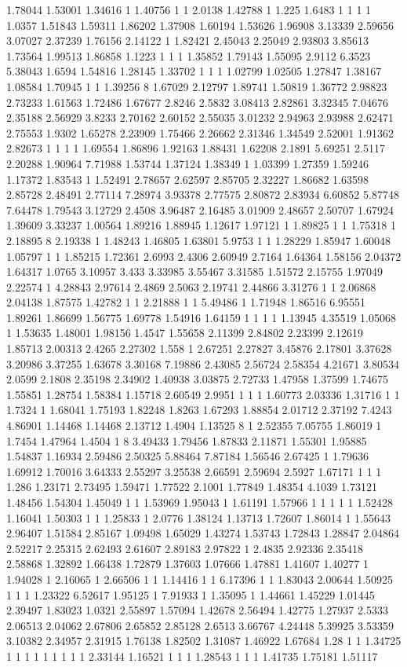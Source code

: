 1.78044 1.53001 1.34616 1 1.40756 1 1 2.0138 1.42788 1 1.225 1.6483 1 1 1 1 1.0357 1.51843 1.59311 1.86202 1.37908 1.60194 1.53626 1.96908 3.13339 2.59656 3.07027 2.37239 1.76156 2.14122 1 1.82421 2.45043 2.25049 2.93803 3.85613 1.73564 1.99513 1.86858 1.1223 1 1 1 1.35852 1.79143 1.55095 2.9112 6.3523 5.38043 1.6594 1.54816 1.28145 1.33702 1 1 1 1.02799 1.02505 1.27847 1.38167 1.08584 1.70945 1 1 1.39256 8 1.67029 2.12797 1.89741 1.50819 1.36772 2.98823 2.73233 1.61563 1.72486 1.67677 2.8246 2.5832 3.08413 2.82861 3.32345 7.04676 2.35188 2.56929 3.8233 2.70162 2.60152 2.55035 3.01232 2.94963 2.93988 2.62471 2.75553 1.9302 1.65278 2.23909 1.75466 2.26662 2.31346 1.34549 2.52001 1.91362 2.82673 1 1 1 1 1.69554 1.86896 1.92163 1.88431 1.62208 2.1891 5.69251 2.5117 2.20288 1.90964 7.71988 1.53744 1.37124 1.38349 1 1.03399 1.27359 1.59246 1.17372 1.83543 1 1.52491 2.78657 2.62597 2.85705 2.32227 1.86682 1.63598 2.85728 2.48491 2.77114 7.28974 3.93378 2.77575 2.80872 2.83934 6.60852 5.87748 7.64478 1.79543 3.12729 2.4508 3.96487 2.16485 3.01909 2.48657 2.50707 1.67924 1.39609 3.33237 1.00564 1.89216 1.88945 1.12617 1.97121 1 1.89825 1 1 1.75318 1 2.18895 8 2.19338 1 1.48243 1.46805 1.63801 5.9753 1 1 1.28229 1.85947 1.60048 1.05797 1 1 1.85215 1.72361 2.6993 2.4306 2.60949 2.7164 1.64364 1.58156 2.04372 1.64317 1.0765 3.10957 3.433 3.33985 3.55467 3.31585 1.51572 2.15755 1.97049 2.22574 1 4.28843 2.97614 2.4869 2.5063 2.19741 2.44866 3.31276 1 1 2.06868 2.04138 1.87575 1.42782 1 1 2.21888 1 1 5.49486 1 1.71948 1.86516 6.95551 1.89261 1.86699 1.56775 1.69778 1.54916 1.64159 1 1 1 1 1.13945 4.35519 1.05068 1 1.53635 1.48001 1.98156 1.4547 1.55658 2.11399 2.84802 2.23399 2.12619 1.85713 2.00313 2.4265 2.27302 1.558 1 2.67251 2.27827 3.45876 2.17801 3.37628 3.20986 3.37255 1.63678 3.30168 7.19886 2.43085 2.56724 2.58354 4.21671 3.80534 2.0599 2.1808 2.35198 2.34902 1.40938 3.03875 2.72733 1.47958 1.37599 1.74675 1.55851 1.28754 1.58384 1.15718 2.60549 2.9951 1 1 1 1.60773 2.03336 1.31716 1 1 1.7324 1 1.68041 1.75193 1.82248 1.8263 1.67293 1.88854 2.01712 2.37192 7.4243 4.86901 1.14468 1.14468 2.13712 1.4904 1.13525 8 1 2.52355 7.05755 1.86019 1 1.7454 1.47964 1.4504 1 8 3.49433 1.79456 1.87833 2.11871 1.55301 1.95885 1.54837 1.16934 2.59486 2.50325 5.88464 7.87184 1.56546 2.67425 1 1.79636 1.69912 1.70016 3.64333 2.55297 3.25538 2.66591 2.59694 2.5927 1.67171 1 1 1 1.286 1.23171 2.73495 1.59471 1.77522 2.1001 1.77849 1.48354 4.1039 1.73121 1.48456 1.54304 1.45049 1 1 1.53969 1.95043 1 1.61191 1.57966 1 1 1 1 1 1.52428 1.16041 1.50303 1 1 1.25833 1 2.0776 1.38124 1.13713 1.72607 1.86014 1 1.55643 2.96407 1.51584 2.85167 1.09498 1.65029 1.43274 1.53743 1.72843 1.28847 2.04864 2.52217 2.25315 2.62493 2.61607 2.89183 2.97822 1 2.4835 2.92336 2.35418 2.58868 1.32892 1.66438 1.72879 1.37603 1.07666 1.47881 1.41607 1.40277 1 1.94028 1 2.16065 1 2.66506 1 1 1.14416 1 1 6.17396 1 1 1.83043 2.00644 1.50925 1 1 1 1.23322 6.52617 1.95125 1 7.91933 1 1.35095 1 1.44661 1.45229 1.01445 2.39497 1.83023 1.0321 2.55897 1.57094 1.42678 2.56494 1.42775 1.27937 2.5333 2.06513 2.04062 2.67806 2.65852 2.85128 2.6513 3.66767 4.24448 5.39925 3.53359 3.10382 2.34957 2.31915 1.76138 1.82502 1.31087 1.46922 1.67684 1.28 1 1 1.34725 1 1 1 1 1 1 1 1 1 2.33144 1.16521 1 1 1 1.28543 1 1 1 1.41735 1.75181 1.51117 
